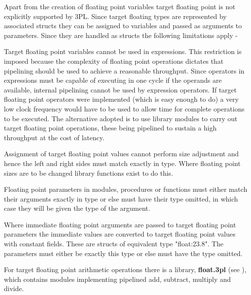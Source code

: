         Apart from the creation of floating point variables target floating
        point is not explicitly supported by 3PL. Since target floating types
        are represented by associated structs they can be assigned to
        variables and passed as arguments to parameters. Since they are handled
        as structs the following limitations apply -
        \blist
        \item   Target floating point variables cannot be
                used in expressions. This restriction is imposed because the
                complexity of floating point operations dictates that pipelining
                should be used to achieve a reasonable throughput. Since
                operators in expressions must be capable of executing in one
                cycle if the operands are available, internal pipelining cannot
                be used by expression operators. If target floating point
                operators were implemented (which is easy enough to do) a very
                low clock frequency would have to be used to allow time for
                complete operations to be executed. The alternative adopted is
                to use library modules to carry out target floating point
                operations, these being pipelined to sustain a high throughput
                at the cost of latency.
        \item   Assignment of target floating point values cannot perform
                size adjustment and hence the left and right sides must match
                exactly in type. Where floating point sizes are to be changed
                library functions exist to do this.
        \item   Floating point parameters in modules, procedures or
                functions must either match their arguments exactly in type
                or else must have their type omitted, in which case they will
                be given the type of the argument.
        \item   Where immediate floating point arguments are passed to
                target floating point parameters the immediate values are
                converted to target floating point values with constant fields.
                These are structs of equivalent type "float:23.8". The
                parameters must either be exactly this type or else must have
                the type omitted.
        \blend
        
        For target floating point arithmetic operations there is a library,
        {\bf float.3pl} (see ), which contains modules
        implementing pipelined add, subtract, multiply and divide.







